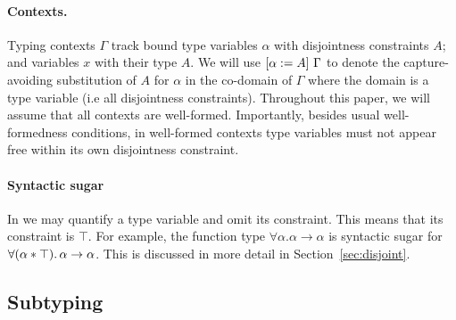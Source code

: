 \paragraph{Contexts.} Typing contexts $ \Gamma $ track bound type variables
$\alpha$ with disjointness constraints $A$; and variables $x$ with their type $A$. 
We will use $\lbrack \alpha := A \rbrack~ {\Gamma}$
to denote the capture-avoiding substitution of $A$ for $\alpha$ in the co-domain of
$\Gamma$ where the domain is a type variable (i.e all disjointness constraints).
Throughout this paper, we will assume that all contexts are
well-formed. Importantly, besides usual well-formedness conditions, in
well-formed contexts type variables must not appear free within its own disjointness constraint.
\paragraph{Syntactic sugar}
In \name we may quantify a type variable and omit its constraint. 
This means that its constraint is $\top$. 
For example, the function type $\forall \alpha. \alpha \to \alpha$ is syntactic sugar
for  $\forall (\alpha * \top).\, \alpha \to \alpha$.
This is discussed in more detail in Section~\ref{sec:disjoint}. 


\subsection{Subtyping}


